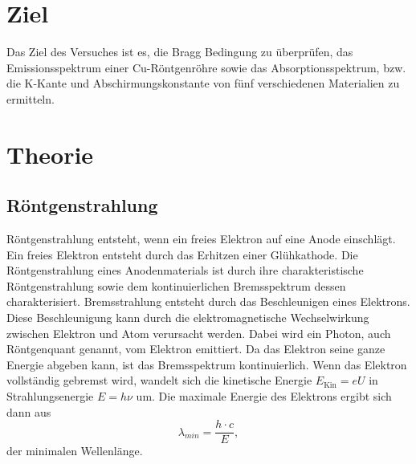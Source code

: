 \section{Ziel}
Das Ziel des Versuches ist es, die Bragg Bedingung zu überprüfen, das Emissionsspektrum einer Cu-Röntgenröhre sowie das Absorptionsspektrum, bzw. die K-Kante und Abschirmungskonstante von fünf verschiedenen Materialien zu ermitteln.

\section{Theorie}

\subsection{Röntgenstrahlung}
Röntgenstrahlung entsteht, wenn ein freies Elektron auf eine Anode einschlägt. Ein freies Elektron entsteht durch das Erhitzen einer Glühkathode. Die Röntgenstrahlung eines Anodenmaterials ist durch ihre charakteristische Röntgenstrahlung sowie dem kontinuierlichen Bremsspektrum dessen charakterisiert. Bremsstrahlung entsteht durch das Beschleunigen eines Elektrons. Diese Beschleunigung kann durch die elektromagnetische Wechselwirkung zwischen Elektron und Atom verursacht werden. Dabei wird ein Photon, auch Röntgenquant genannt, vom Elektron emittiert. Da das Elektron seine ganze Energie abgeben kann, ist das Bremsspektrum kontinuierlich. Wenn das Elektron vollständig gebremst wird, wandelt sich die kinetische Energie $E_{\textrm{Kin}}=eU$ in Strahlungsenergie $E=h\nu$ um. Die maximale Energie des Elektrons ergibt sich dann aus 
\begin{equation}
  \lambda_{min}=\frac{h\cdot c}{E},
  \label{1}
\end{equation}
der minimalen Wellenlänge.\\

